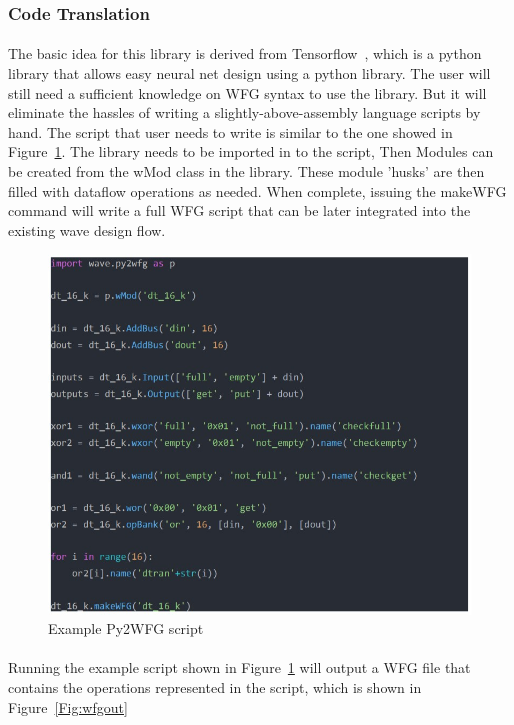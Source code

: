 \subsubsection*{Code Translation}
\paragraph{}
The basic idea for this library is derived from Tensorflow~\cite{tflow}, which is a python library that allows easy neural net design using a python library. The user will still need a sufficient knowledge on WFG syntax to use the library. But it will eliminate the hassles of writing a slightly-above-assembly language scripts by hand. The script that user needs to write is similar to the one showed in Figure~\ref{Fig:py2eg}. The library needs to be imported in to the script, Then Modules can be created from the wMod class in the library. These module 'husks' are then filled with dataflow operations as needed. When complete, issuing the makeWFG command will write a full WFG script that can be later integrated into the existing wave design flow.

\begin{figure}[H]
    \centering
    \includegraphics[trim=0cm 0cm 0cm 0cm, clip=true,scale=0.7]{figures/py2wfg_eg.jpg}
    \caption{Example Py2WFG script\label{Fig:py2eg}}\vspace{-4mm}
    \end{figure}

\paragraph{}
Running the example script shown in Figure~\ref{Fig:py2eg} will output a WFG file that contains the operations represented in the script, which is shown in Figure~\ref{Fig:wfgout}

